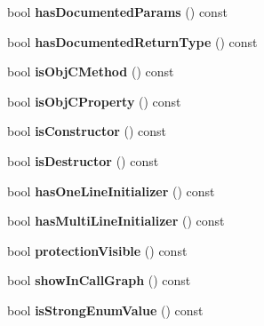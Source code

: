 \begin{DoxyCompactItemize}
\item 
\mbox{\label{class_member_def_ab42fc87bee3c06cb97ec829deee81140}} 
bool {\bfseries has\+Documented\+Params} () const
\item 
\mbox{\label{class_member_def_a8ca5aba46ae8a81b32fb29afaf8f66bd}} 
bool {\bfseries has\+Documented\+Return\+Type} () const
\item 
\mbox{\label{class_member_def_a99e35943c6389445585f9c66809d855a}} 
bool {\bfseries is\+Obj\+C\+Method} () const
\item 
\mbox{\label{class_member_def_a657f50986ef08154c4e58d57b1dc9f6b}} 
bool {\bfseries is\+Obj\+C\+Property} () const
\item 
\mbox{\label{class_member_def_a093d938d6bd7697df568f25d8f8c12c5}} 
bool {\bfseries is\+Constructor} () const
\item 
\mbox{\label{class_member_def_ae4bab9495fc0ca2f243fa14f2b96e5af}} 
bool {\bfseries is\+Destructor} () const
\item 
\mbox{\label{class_member_def_a451b836d414ec646b7297f580ec93c7f}} 
bool {\bfseries has\+One\+Line\+Initializer} () const
\item 
\mbox{\label{class_member_def_abf7280c7d02dbe91863dcb726aada33f}} 
bool {\bfseries has\+Multi\+Line\+Initializer} () const
\item 
\mbox{\label{class_member_def_ad31f991a70ef2c44effe41ad4764f427}} 
bool {\bfseries protection\+Visible} () const
\item 
\mbox{\label{class_member_def_ac901e85c2918e0c99c9700c02ddf65e3}} 
bool {\bfseries show\+In\+Call\+Graph} () const
\item 
\mbox{\label{class_member_def_a360c319157f6258fec04a0c5b13fe22f}} 
bool {\bfseries is\+Strong\+Enum\+Value} () const
\item 
\mbox{\label{class_member_def_a3779f9d9d52359ce5182f823edb4ff0e}} 

\end{DoxyCompactItemize}
